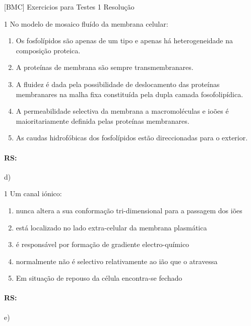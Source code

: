 \documentclass[\mainfilename]{subfiles}
\begin{document}
[BMC]
{Exercicios para Testes 1} %
{Resolução} %

\begin{questionBox}1{ %
    No modelo de mosaico fluído da membrana celular:
} %

    \begin{enumerate}[label=\alph{enumi})]
        \item Os fosfolípidos são apenas de um tipo e apenas há heterogeneidade na composição proteica.
        \item A proteínas de membrana são sempre transmembranares.
        \item A fluidez é dada pela possibilidade de deslocamento das proteínas membranares na malha fixa constituída pela dupla camada fosofolipídica.
        \item A permeabilidade selectiva da membrana a macromoléculas e ioões é maioritariamente definida pelas proteínas membranares.
        \item As caudas hidrofóbicas dos fosfolípidos estão direccionadas para o exterior.
    \end{enumerate}
    
    \paragraph*{RS:} d)

\end{questionBox}

\begin{questionBox}1{ %
    Um canal iónico:
} %
    
    \begin{enumerate}[label=\alph{enumi})]
        \item nunca altera a sua conformação tri-dimensional para a passagem dos iões 
        \item está localizado no lado extra-celular da membrana plasmática
        \item é responsável por formação de gradiente electro-químico
        \item normalmente não é selectivo relativamente ao ião que o atravessa
        \item Em situação de repouso da célula encontra-se fechado
    \end{enumerate}

    \paragraph*{RS:} e)
    
\end{questionBox}
\end{document}
